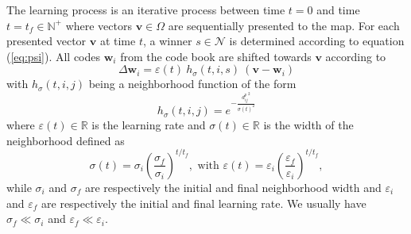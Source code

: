 The learning process is an iterative process between time $t=0$ and time $t=t_f \in \mathbb{N}^+$ where vectors $\mathbf{v} \in \Omega$ are sequentially presented to the map. For each presented vector $\mathbf{v}$ at time $t$, a winner $s \in \mathcal{N}$ is determined according to equation (\ref{eq:psi}). All codes $\mathbf{w}_{i}$ from the code book are shifted towards $\mathbf{v}$ according to
\begin{equation}
  \Delta\mathbf{w}_{i} = \varepsilon(t)~h_\sigma(t,i,s)~(\mathbf{v} -
  \mathbf{w}_i)
  \label{eq:som-learning}
\end{equation}
with $h_\sigma(t,i,j)$ being a neighborhood function of the form
\begin{equation}
  h_\sigma(t,i,j) = e^{- \frac{{d^p_{ij}}^2}{\sigma(t)^2}}
  \label{eq:som-neighborhood}
\end{equation}
where $\varepsilon(t) \in \mathbb{R}$ is the learning rate and $\sigma(t) \in \mathbb{R}$
is the width of the neighborhood defined as
\begin{equation}
  \sigma(t) =
  \sigma_i\left(\frac{\sigma_f}{\sigma_i}\right)^{t/t_f}, \text{ with } \varepsilon(t) =
  \varepsilon_i\left(\frac{\varepsilon_f}{\varepsilon_i}\right)^{t/t_f},
\end{equation}
while $\sigma_i$ and $\sigma_f$ are respectively the initial and final neighborhood width and $\varepsilon_i$ and $\varepsilon_f$ are respectively the initial and final learning rate. We usually have $\sigma_f \ll \sigma_i$ and $\varepsilon_f \ll \varepsilon_i$.

